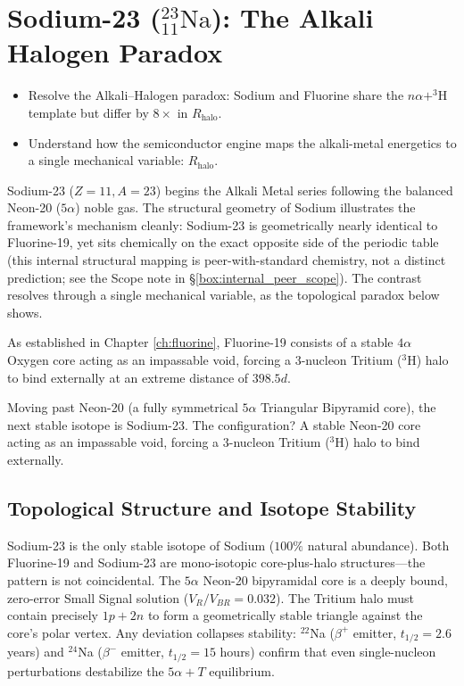 \chapter{Sodium-23 ($^{23}_{11}\text{Na}$): The Alkali Halogen Paradox}
\label{ch:sodium}

\begin{objectivebox}
\begin{itemize}
    \item Resolve the Alkali--Halogen paradox: Sodium and Fluorine share the $n\alpha + ^3$H template but differ by $8\times$ in $R_{\text{halo}}$.
    \item Understand how the semiconductor engine maps the alkali-metal energetics to a single mechanical variable: $R_{\text{halo}}$.
\end{itemize}
\end{objectivebox}


Sodium-23 ($Z=11, A=23$) begins the Alkali Metal series following the balanced Neon-20 ($5\alpha$) noble gas. The structural geometry of Sodium illustrates the framework's mechanism cleanly: Sodium-23 is geometrically nearly identical to Fluorine-19, yet sits chemically on the exact opposite side of the periodic table (this internal structural mapping is peer-with-standard chemistry, not a distinct prediction; see the Scope note in \S\ref{box:internal_peer_scope}). The contrast resolves through a single mechanical variable, as the topological paradox below shows.

As established in Chapter \ref{ch:fluorine}, Fluorine-19 consists of a stable $4\alpha$ Oxygen core acting as an impassable void, forcing a 3-nucleon Tritium ($^3\text{H}$) halo to bind externally at an extreme distance of $398.5d$.

Moving past Neon-20 (a fully symmetrical $5\alpha$ Triangular Bipyramid core), the next stable isotope is Sodium-23. The configuration? A stable Neon-20 core acting as an impassable void, forcing a 3-nucleon Tritium ($^3\text{H}$) halo to bind externally.

\section{Topological Structure and Isotope Stability}
Sodium-23 is the only stable isotope of Sodium ($100\%$ natural abundance). Both Fluorine-19 and Sodium-23 are mono-isotopic core-plus-halo structures---the pattern is not coincidental. The $5\alpha$ Neon-20 bipyramidal core is a deeply bound, zero-error Small Signal solution ($V_R/V_{BR} = 0.032$). The Tritium halo must contain precisely $1p + 2n$ to form a geometrically stable triangle against the core's polar vertex. Any deviation collapses stability: $^{22}$Na ($\beta^+$ emitter, $t_{1/2} = 2.6$ years) and $^{24}$Na ($\beta^-$ emitter, $t_{1/2} = 15$ hours) confirm that even single-nucleon perturbations destabilize the $5\alpha + T$ equilibrium.

